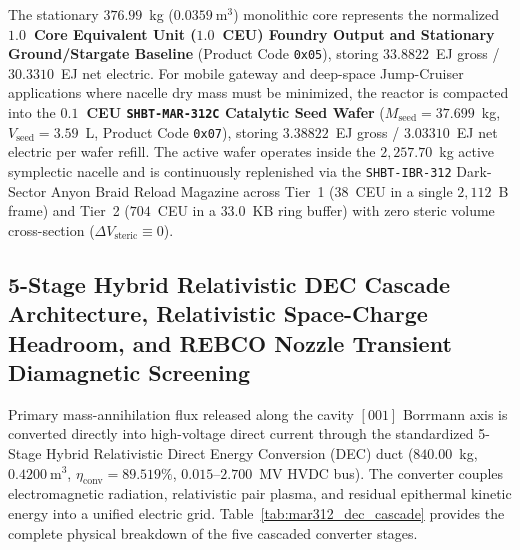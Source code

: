 \documentclass[11pt,onecolumn]{article}
\begin{document}
The stationary $376.99$~kg ($0.0359~\text{m}^3$) monolithic core represents the normalized \textbf{$1.0$~Core Equivalent Unit ($1.0$~CEU) Foundry Output and Stationary Ground/Stargate Baseline} (Product Code \texttt{0x05}), storing $33.8822$~EJ gross / $30.3310$~EJ net electric. For mobile gateway and deep-space Jump-Cruiser applications where nacelle dry mass must be minimized, the reactor is compacted into the \textbf{$0.1$~CEU \texttt{SHBT-MAR-312C} Catalytic Seed Wafer} ($M_{\text{seed}} = 37.699$~kg, $V_{\text{seed}} = 3.59$~L, Product Code \texttt{0x07}), storing $3.38822$~EJ gross / $3.03310$~EJ net electric per wafer refill. The active wafer operates inside the $2{,}257.70$~kg active symplectic nacelle and is continuously replenished via the \texttt{SHBT-IBR-312} Dark-Sector Anyon Braid Reload Magazine across Tier~1 ($38$~CEU in a single $2{,}112$~B frame) and Tier~2 ($704$~CEU in a $33.0$~KB ring buffer) with zero steric volume cross-section ($\Delta V_{\text{steric}} \equiv 0$).

\FloatBarrier
\subsection[5-Stage Hybrid Relativistic DEC Cascade, Space-Charge and REBCO Screening]{5-Stage Hybrid Relativistic DEC Cascade Architecture, Relativistic Space-Charge Headroom, and REBCO Nozzle Transient Diamagnetic Screening}
\label{subsec:dec_cascade}
Primary mass-annihilation flux released along the cavity $[001]$ Borrmann axis is converted directly into high-voltage direct current through the standardized 5-Stage Hybrid Relativistic Direct Energy Conversion (DEC) duct ($840.00$~kg, $0.4200~\text{m}^3$, $\eta_{\text{conv}} = 89.519\%$, $0.015\text{--}2.700$~MV HVDC bus). The converter couples electromagnetic radiation, relativistic pair plasma, and residual epithermal kinetic energy into a unified electric grid. Table~\ref{tab:mar312_dec_cascade} provides the complete physical breakdown of the five cascaded converter stages.
\end{document}
